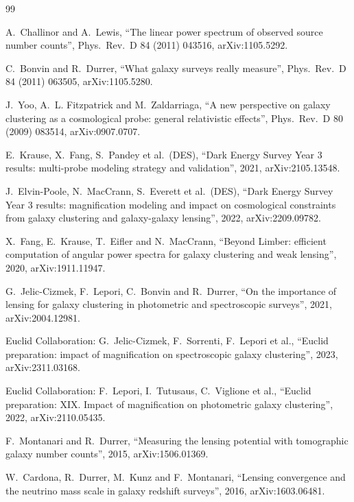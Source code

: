 \documentclass[11pt]{article}
\begin{document}
\begin{thebibliography}{99}

A.~Challinor and A.~Lewis,
``The linear power spectrum of observed source number counts'',
Phys.\ Rev.\ D 84 (2011) 043516, arXiv:1105.5292.

C.~Bonvin and R.~Durrer,
``What galaxy surveys really measure'',
Phys.\ Rev.\ D 84 (2011) 063505, arXiv:1105.5280.

J.~Yoo, A.~L. Fitzpatrick and M.~Zaldarriaga,
``A new perspective on galaxy clustering as a cosmological probe:
general relativistic effects'',
Phys.\ Rev.\ D 80 (2009) 083514, arXiv:0907.0707.

E.~Krause, X.~Fang, S.~Pandey et al.\ (DES),
``Dark Energy Survey Year 3 results: multi-probe modeling strategy
and validation'',
2021, arXiv:2105.13548.

J.~Elvin-Poole, N.~MacCrann, S.~Everett et al.\ (DES),
``Dark Energy Survey Year 3 results: magnification modeling and
impact on cosmological constraints from galaxy clustering and
galaxy-galaxy lensing'',
2022, arXiv:2209.09782.

X.~Fang, E.~Krause, T.~Eifler and N.~MacCrann,
``Beyond Limber: efficient computation of angular power spectra for
galaxy clustering and weak lensing'',
2020, arXiv:1911.11947.

G.~Jelic-Cizmek, F.~Lepori, C.~Bonvin and R.~Durrer,
``On the importance of lensing for galaxy clustering in photometric
and spectroscopic surveys'',
2021, arXiv:2004.12981.

Euclid Collaboration: G.~Jelic-Cizmek, F.~Sorrenti, F.~Lepori et al.,
``Euclid preparation: impact of magnification on spectroscopic
galaxy clustering'',
2023, arXiv:2311.03168.

Euclid Collaboration: F.~Lepori, I.~Tutusaus, C.~Viglione et al.,
``Euclid preparation: XIX. Impact of magnification on photometric
galaxy clustering'',
2022, arXiv:2110.05435.

F.~Montanari and R.~Durrer,
``Measuring the lensing potential with tomographic galaxy number
counts'',
2015, arXiv:1506.01369.

W.~Cardona, R.~Durrer, M.~Kunz and F.~Montanari,
``Lensing convergence and the neutrino mass scale in galaxy redshift
surveys'',
2016, arXiv:1603.06481.


\end{thebibliography}
\end{document}
